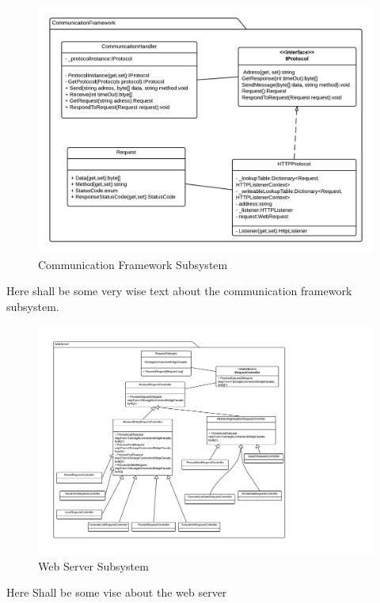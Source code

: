 \begin{figure}[H]
\includegraphics[scale=0.2]{img/CommunicationFrameworkSubsystem.png}
\caption{Communication Framework Subsystem}
\label{fig:CommunicationFramework}
\end{figure}
Here shall be some very wise text about the communication framework subsystem.


\begin{figure}[H]
\includegraphics[scale=0.2]{img/NewWebserverSubsystem.png}
\caption{Web Server Subsystem}
\label{fig:WebServer}
\end{figure}
Here Shall be some vise about the web server



